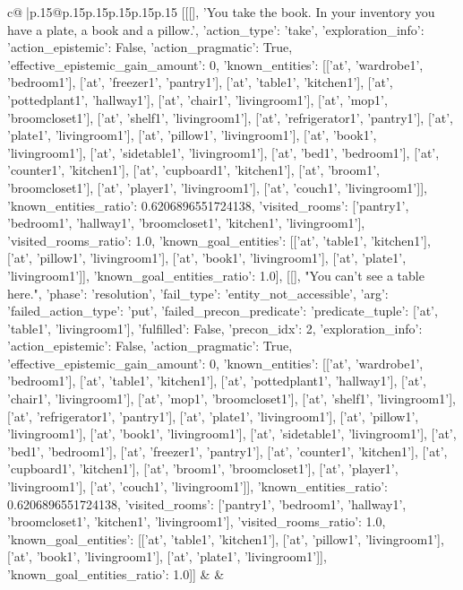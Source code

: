 \documentclass{article}
\begin{document}
{\begin{supertabular}{c@{$\;$}|p{.15\linewidth}@{}p{.15\linewidth}p{.15\linewidth}p{.15\linewidth}p{.15\linewidth}p{.15\linewidth}}
{{{	 [[[], 'You take the book. In your inventory you have a plate, a book and a pillow.', {'action_type': 'take', 'exploration_info': {'action_epistemic': False, 'action_pragmatic': True, 'effective_epistemic_gain_amount': 0, 'known_entities': [['at', 'wardrobe1', 'bedroom1'], ['at', 'freezer1', 'pantry1'], ['at', 'table1', 'kitchen1'], ['at', 'pottedplant1', 'hallway1'], ['at', 'chair1', 'livingroom1'], ['at', 'mop1', 'broomcloset1'], ['at', 'shelf1', 'livingroom1'], ['at', 'refrigerator1', 'pantry1'], ['at', 'plate1', 'livingroom1'], ['at', 'pillow1', 'livingroom1'], ['at', 'book1', 'livingroom1'], ['at', 'sidetable1', 'livingroom1'], ['at', 'bed1', 'bedroom1'], ['at', 'counter1', 'kitchen1'], ['at', 'cupboard1', 'kitchen1'], ['at', 'broom1', 'broomcloset1'], ['at', 'player1', 'livingroom1'], ['at', 'couch1', 'livingroom1']], 'known_entities_ratio': 0.6206896551724138, 'visited_rooms': ['pantry1', 'bedroom1', 'hallway1', 'broomcloset1', 'kitchen1', 'livingroom1'], 'visited_rooms_ratio': 1.0, 'known_goal_entities': [['at', 'table1', 'kitchen1'], ['at', 'pillow1', 'livingroom1'], ['at', 'book1', 'livingroom1'], ['at', 'plate1', 'livingroom1']], 'known_goal_entities_ratio': 1.0}}], [[], "You can't see a table here.", {'phase': 'resolution', 'fail_type': 'entity_not_accessible', 'arg': {'failed_action_type': 'put', 'failed_precon_predicate': {'predicate_tuple': ['at', 'table1', 'livingroom1'], 'fulfilled': False, 'precon_idx': 2}}, 'exploration_info': {'action_epistemic': False, 'action_pragmatic': True, 'effective_epistemic_gain_amount': 0, 'known_entities': [['at', 'wardrobe1', 'bedroom1'], ['at', 'table1', 'kitchen1'], ['at', 'pottedplant1', 'hallway1'], ['at', 'chair1', 'livingroom1'], ['at', 'mop1', 'broomcloset1'], ['at', 'shelf1', 'livingroom1'], ['at', 'refrigerator1', 'pantry1'], ['at', 'plate1', 'livingroom1'], ['at', 'pillow1', 'livingroom1'], ['at', 'book1', 'livingroom1'], ['at', 'sidetable1', 'livingroom1'], ['at', 'bed1', 'bedroom1'], ['at', 'freezer1', 'pantry1'], ['at', 'counter1', 'kitchen1'], ['at', 'cupboard1', 'kitchen1'], ['at', 'broom1', 'broomcloset1'], ['at', 'player1', 'livingroom1'], ['at', 'couch1', 'livingroom1']], 'known_entities_ratio': 0.6206896551724138, 'visited_rooms': ['pantry1', 'bedroom1', 'hallway1', 'broomcloset1', 'kitchen1', 'livingroom1'], 'visited_rooms_ratio': 1.0, 'known_goal_entities': [['at', 'table1', 'kitchen1'], ['at', 'pillow1', 'livingroom1'], ['at', 'book1', 'livingroom1'], ['at', 'plate1', 'livingroom1']], 'known_goal_entities_ratio': 1.0}}]] 
	  } 
	   } 
	   } 
	 & & \\ 
 


\end{supertabular}}
\end{document}
